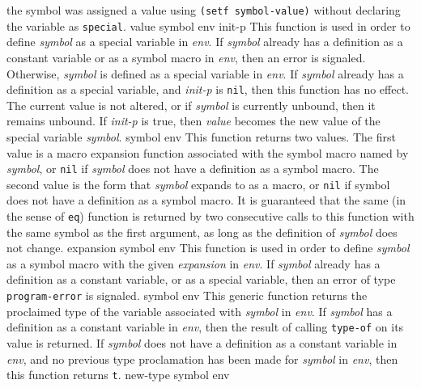 the symbol was assigned a value using \texttt{(setf symbol-value)}
without declaring the variable as \texttt{special}.
\vskip -0.05cm
 {value symbol env init-p}
\vskip -0.2cm
This function is used in order to define \textit{symbol} as a special
variable in \textit{env}.
\vskip -0.05cm
If \textit{symbol} already has a definition as a constant variable or as a
symbol macro in \textit{env}, then an error is signaled.
Otherwise, \textit{symbol} is defined as a special variable in \textit{env}.
\vskip -0.05cm
If \textit{symbol} already has a definition as a special variable, and
\textit{init-p} is \texttt{nil}, then this function has no effect.  The
current value is not altered, or if \textit{symbol} is currently
unbound, then it remains unbound.
\vskip -0.05cm
If \textit{init-p} is true, then \textit{value} becomes the new
value of the special variable \textit{symbol}.
\vskip -0.05cm
 {symbol env}
\vskip -0.2cm
This function returns two values.  The first value is a macro
expansion function associated with the symbol macro named by \textit{symbol},
or \texttt{nil} if \textit{symbol} does not have a definition as a symbol
macro.  The second value is the form that \textit{symbol} expands to as a
macro, or \texttt{nil} if symbol does not have a definition as a
symbol macro.
\vskip -0.05cm
It is guaranteed that the same (in the sense of \texttt{eq}) function
is returned by two consecutive calls to this function with the same
symbol as the first argument, as long as the definition
of \textit{symbol} does not change.
\vskip -0.05cm
 {expansion symbol env}
\vskip -0.2cm
This function is used in order to define \textit{symbol} as a symbol macro
with the given \textit{expansion} in \textit{env}.
\vskip -0.05cm
If \textit{symbol} already has a definition as a constant variable, or
as a special variable, then an error of type \texttt{program-error} is
signaled.
\vskip -0.05cm
 {symbol env}
\vskip -0.2cm
This generic function returns the proclaimed type of the variable
associated with \textit{symbol} in \textit{env}.
\vskip -0.05cm
If \textit{symbol} has a definition as a constant variable in \textit{env},
then the result of calling \texttt{type-of} on its value is returned.
\vskip -0.05cm
If \textit{symbol} does not have a definition as a constant variable in
\textit{env}, and no previous type proclamation has been made for
\textit{symbol} in \textit{env}, then this function returns \texttt{t}.
\vskip -0.05cm
 {new-type symbol env}
